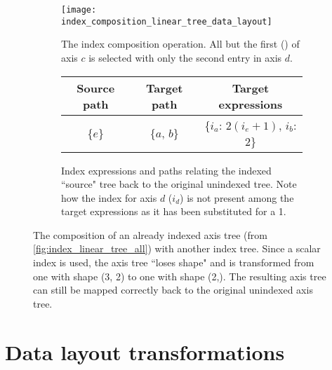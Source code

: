 \documentclass[thesis]{subfiles}
\begin{document}
\begin{figure}
  \centering
  \begin{subfigure}{\textwidth}
    \centering
    \texttt{[image: index\_composition\_linear\_tree\_data\_layout]}
    \caption{
      The index composition operation.
      All but the first () of axis $c$ is selected with only the second entry in axis $d$.
    }
    \label{fig:index_composition_linear_tree_data_layout}
  \end{subfigure}

  \vspace{1em}

  \begin{subfigure}{\textwidth}
    \centering
    \begin{tabular}{|c|c|c|}
      \hline
      \textbf{Source path} & \textbf{Target path} & \textbf{Target expressions} \\
      \hline
      \{$e$\} & \{$a$, $b$\} & \{$i_a$: $2 (i_e+1)$, $i_b$: $2$\} \\
      \hline
    \end{tabular}
    \caption{
      Index expressions and paths relating the indexed ``source" tree back to the original unindexed tree.
      Note how the index for axis $d$ ($i_d$) is not present among the target expressions as it has been substituted for a 1.
    }
    \label{fig:index_composition_linear_tree_exprs}
  \end{subfigure}

  \caption{
    The composition of an already indexed axis tree (from \cref{fig:index_linear_tree_all}) with another index tree.
    Since a scalar index is used, the axis tree ``loses shape" and is transformed from one with shape (3, 2) to one with shape (2,).
    The resulting axis tree can still be mapped correctly back to the original unindexed axis tree.
  }
  \label{fig:index_composition_linear_tree_all}
\end{figure}


\section{Data layout transformations}
\label{sec:indexing_data_layout_transformations}

\end{document}
